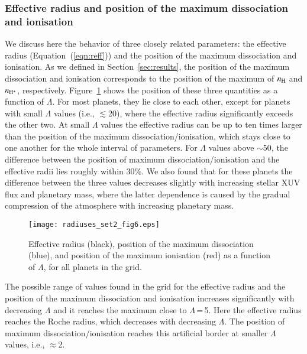 \documentclass{aa}
\def\nh{n_{\rm H}}
\def\nhp{n_{\rm H^+}}
\begin{document}
\subsubsection{Effective radius and position of the maximum dissociation and ionisation}\label{sec:barriers}
%
We discuss here the behavior of three closely related parameters: the effective radius (Equation~(\ref{eqn:reff})) and the position of the maximum dissociation and ionisation. As we defined in Section~\ref{sec:results}, the position of the maximum dissociation and ionisation corresponds to the position of the maximum of $\nh$ and $\nhp$, respectively. Figure~\ref{fig:reff-dis-ion} shows the position of these three quantities as a function of $\Lambda$. For most planets, they lie close to each other, except for planets with small $\Lambda$ values (i.e., $\lesssim$20), where the effective radius significantly exceeds the other two. At small $\Lambda$ values the effective radius can be up to ten times larger than the position of the maximum dissociation/ionisation, which stays close to one another for the whole interval of parameters. For $\Lambda$ values above $\sim$50, the difference between the position of maximum dissociation/ionisation and the effective radii lies roughly within 30\%. We also found that for these planets the difference between the three values decreases slightly with increasing stellar XUV flux and planetary mass, where the latter dependence is caused by the gradual compression of the atmosphere with increasing planetary mass.
\begin{figure}[h!]
\texttt{[image: radiuses\_set2\_fig6.eps]}
\caption{{Effective radius (black), position of the maximum
dissociation (blue), and position of the maximum ionisation (red)
as a function of $\Lambda$, for all planets in the grid.}}
\label{fig:reff-dis-ion}
\end{figure}

The possible range of values found in the grid for the effective radius and the position of the maximum dissociation and ionisation increases significantly with decreasing $\Lambda$ and it reaches the maximum close to $\Lambda$\,=\,5. Here the effective radius reaches the Roche radius, which decreases with decreasing $\Lambda$. The position of maximum dissociation/ionisation reaches this artificial border at smaller $\Lambda$ values, i.e., $\approx$2.
\end{document}
